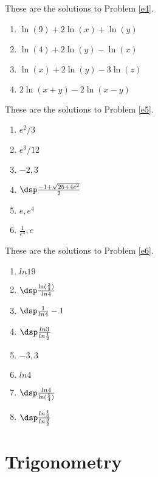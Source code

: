 \begin{sol}
These are the solutions to Problem \ref{e4}.
    \begin{enumerate}
    \item $\ln(9) + 2\ln(x) + \ln(y)$
    \item $\ln(4) + 2\ln(y) - \ln(x)$
    \item $\ln(x) + 2\ln(y) - 3\ln(z)$
    \item $2\ln(x+y) - 2\ln(x-y)$
    \end{enumerate}
\end{sol}

\begin{sol}
These are the solutions to Problem \ref{e5}.
    \begin{enumerate}
    \item $e^2/3$
    \item $e^3/12$
    \item $-2,3$
    \item $\dsp \frac{-1+\sqrt{25+4e^2}}{2}$
    \item $e, e^4$
    \item $\frac{1}{e^3},e$
    \end{enumerate}
\end{sol}

\begin{sol}
These are the solutions to Problem \ref{e6}.
    \begin{enumerate}
    \item $ln19$
    \item $\dsp \frac{\ln(\frac{2}{3})}{ln4}$
    \item $\dsp \frac{1}{ln4}-1$
    \item $\dsp \frac{ln3}{ln\frac{1}{2}}$
    \item $-3,3$
    \item $ln4$
    \item $\dsp \frac{ln4}{\ln(\frac{5}{4})}$
    \item $\dsp \frac{ln\frac{1}{6}}{ln\frac{9}{2}}$
    \end{enumerate}
\end{sol}


\section{Trigonometry} \label{apptrig}

\setcounter{dfn}{0}
\setcounter{prb}{0}
\setcounter{axm}{0}
\setcounter{expl}{0}
\setcounter{lem}{0}
\setcounter{thm}{0}

